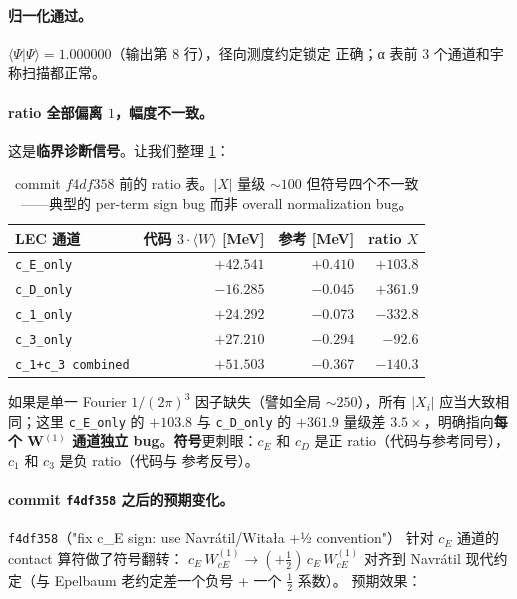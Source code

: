 \paragraph{归一化通过。}
\(\langle\Psi|\Psi\rangle = 1.000000\)（输出第 8 行），径向测度约定锁定
正确；α 表前 3 个通道和宇称扫描都正常。

\paragraph{ratio 全部偏离 \(1\)，幅度不一致。}
这是\textbf{临界诊断信号}。让我们整理 \cref{tab:ch17-witala-results}：

\begin{table}[h]
\centering
\caption{commit \(f4df358\) 前的 ratio 表。\(|X|\) 量级 \(\sim 100\)
但符号四个不一致——典型的 per-term sign bug 而非 overall normalization
bug。}
\label{tab:ch17-witala-results}
\begin{tabular}{lrrr}
\toprule
LEC 通道 & 代码 \(3\cdot\langle W\rangle\) [MeV] & 参考 [MeV] & ratio \(X\) \\
\midrule
\texttt{c\_E\_only}    & \(+42.541\) & \(+0.410\) & \(+103.8\) \\
\texttt{c\_D\_only}    & \(-16.285\) & \(-0.045\) & \(+361.9\) \\
\texttt{c\_1\_only}    & \(+24.292\) & \(-0.073\) & \(-332.8\) \\
\texttt{c\_3\_only}    & \(+27.210\) & \(-0.294\) & \(-92.6\) \\
\midrule
\texttt{c\_1+c\_3 combined} & \(+51.503\) & \(-0.367\) & \(-140.3\) \\
\bottomrule
\end{tabular}
\end{table}

如果是单一 Fourier \(1/(2\pi)^3\) 因子缺失（譬如全局 \(\sim 250\)），所有
\(|X_i|\) 应当大致相同；这里 \texttt{c\_E\_only} 的 \(+103.8\) 与
\texttt{c\_D\_only} 的 \(+361.9\) 量级差 \(3.5\times\)，明确指向\textbf{每
个 W\(^{(1)}\) 通道独立 bug}。\textbf{符号}更刺眼：\(c_E\) 和 \(c_D\)
是正 ratio（代码与参考同号），\(c_1\) 和 \(c_3\) 是负 ratio（代码与
参考反号）。

\paragraph{commit \texttt{f4df358} 之后的预期变化。}
\texttt{f4df358}（"fix c\_E sign: use Navrátil/Witała +½ convention"）
针对 \(c_E\) 通道的 contact 算符做了符号翻转：
\(c_E\,W^{(1)}_{cE} \to (+\frac{1}{2})\,c_E\,W^{(1)}_{cE}\) 对齐到 Navrátil
现代约定（与 Epelbaum 老约定差一个负号 + 一个 \(\frac{1}{2}\) 系数）。
预期效果：

